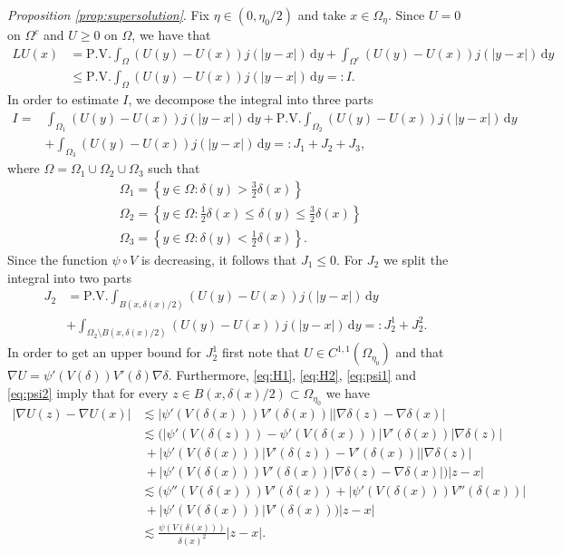 \documentclass[a4paper,12pt,draft]{article}
\theoremstyle{plain}
\theoremstyle{definition}
\numberwithin{equation}{section}
\renewcommand{\le}{\leqslant}
\renewcommand{\leq}{\leqslant}
\renewcommand{\ge}{\geqslant}
\newcommand{\1}{1}
\newcommand{\dy} {\, \mathrm{d}y}
\def\proofof{\noindent{\emph{Proof of}} }
\begin{document}
\proofof \emph{Proposition \ref{prop:supersolution}}. 
Fix $\eta\in(0,\eta_0/2)$ and take $x\in\Omega_\eta$. Since $U=0$ on $\Omega^c$ and $U\ge 0$ on $\Omega$, we have that
\begin{align*}
LU(x)&=\text{P.V.}\int_\Omega (U(y)-U(x))j(|y-x|)\dy + \int_{\Omega^c} (U(y)-U(x))j(|y-x|)\dy\\
&\le \text{P.V.}\int_\Omega (U(y)-U(x))j(|y-x|)\dy=:I.
\end{align*}
In order to estimate $I$, we decompose the integral into three parts
\begin{align*}
I=&\int_{\Omega_1} (U(y)-U(x))j(|y-x|)\dy+\text{P.V.}\int_{\Omega_2} (U(y)-U(x))j(|y-x|)\dy\\
&+\int_{\Omega_3} (U(y)-U(x))j(|y-x|)\dy=:J_1+J_2+J_3,
\end{align*}
where $\Omega=\Omega_1\cup\Omega_2\cup\Omega_3$ such that
\begin{align*}
&\Omega_1=\left\{y\in\Omega: \delta(y)>\tfrac{3}{2}\delta(x)\right\}\\
&\Omega_2=\left\{y\in\Omega: \tfrac{1}{2}\delta(x)\leq\delta(y)\leq\tfrac{3}{2}\delta(x)\right\}\\
&\Omega_3=\left\{y\in\Omega: \delta(y)<\tfrac{1}{2}\delta(x)\right\}.
\end{align*}
Since the function $\psi\circ V$ is decreasing, it follows that $J_1\leq 0$. For $J_2$ we split the integral into two parts
\begin{align*}
J_2&=\text{P.V.}\int_{B(x,\delta(x)/2)} (U(y)-U(x))j(|y-x|)\dy\\
&+\int_{\Omega_2\setminus B(x,\delta(x)/2)} (U(y)-U(x))j(|y-x|)\dy=:J_2^1+J_2^2.
\end{align*}
In order to get an upper bound for $J_2^1$ first note that $U\in C^{1,1}(\Omega_{\eta_0})$ and that $\nabla U=\psi'(V(\delta))V'(\delta)\nabla \delta$. Furthermore, \eqref{eq:H1}, \eqref{eq:H2}, \eqref{eq:psi1} and \eqref{eq:psi2} imply that for every $z\in B(x,\delta(x)/2)\subset\Omega_{\eta_0}$ we have
\begin{align}\label{e:gradient_U}
    |\nabla U(z)-\nabla U(x)|&\lesssim |\psi'(V(\delta(x)))V'(\delta(x))||\nabla \delta(z)-\nabla \delta(x)|\nonumber\\
    &\lesssim \big(|\psi'(V(\delta(z)))-\psi'(V(\delta(x)))|V'(\delta(x))|\nabla\delta(z)|\nonumber\\
    &\ +|\psi'(V(\delta(x)))|V'(\delta(z))-V'(\delta(x))||\nabla\delta(z)|\nonumber\\
    &\ +|\psi'(V(\delta(x)))V'(\delta(x))|\nabla\delta(z)-\nabla\delta(x)| \big)|z-x| \nonumber\\
    &\lesssim \big(\psi''(V(\delta(x)))V'(\delta(x))+|\psi'(V(\delta(x)))V''(\delta(x))|\nonumber\\
    &\ +|\psi'(V(\delta(x)))|V'(\delta(x)) \big)|z-x| \nonumber\\
   &\lesssim \frac{\psi(V(\delta(x)))}{\delta(x)^2}|z-x| .
\end{align}
\end{document}

